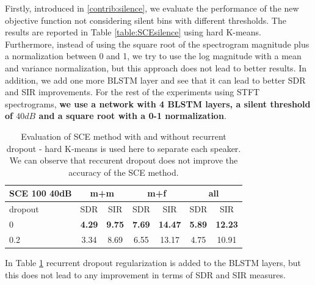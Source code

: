 \documentclass[master, tikz, final,11pt, dvipdfmx]{iscs-thesis}
\begin{document}
Firstly, introduced in \autoref{contrib:silence}, we evaluate the performance of the new objective function not considering silent bins with different thresholds. The results are reported in Table \ref{table:SCEsilence} using hard K-means. Furthermore, instead of using the square root of the spectrogram magnitude plus a normalization between 0 and 1, we try to use the log magnitude with a mean and variance normalization, but this approach does not lead to better results. In addition, we add one more BLSTM layer and see that it can lead to better SDR and SIR improvements. For the rest of the experiments using STFT spectrograms, \textbf{we use a network with 4 BLSTM layers, a silent threshold of $40dB$ and a square root with a 0-1 normalization}.

\begin{table}[h]
\centering
\begin{tabular}{l|c|c|c|c|c|c}
SCE 100 40dB & \multicolumn{2}{c|}{m+m} & \multicolumn{2}{c|}{m+f} & \multicolumn{2}{c}{all} \\ 
\hline 
dropout & SDR & SIR & SDR & SIR & SDR & SIR  \\ 
\hline 
0 & \textbf{4.29} & \textbf{9.75} & \textbf{7.69} & \textbf{14.47} & \textbf{5.89} & \textbf{12.23} \\ 
0.2 & 3.34 & 8.69 &  6.55 & 13.17 & 4.75 & 10.91 \\ 
\end{tabular}
\caption[Evaluation of SCE method with and without recurrent dropout]{Evaluation of SCE method with and without recurrent dropout - hard K-means is used here to separate each speaker. We can observe that reccurent dropout does not improve the accuracy of the SCE method.}
\label{table:SCE100drop}
\end{table}

In Table \ref{table:SCE100drop} recurrent dropout regularization is added to the BLSTM layers, but this does not lead to any improvement in terms of SDR and SIR measures.
\end{document}
